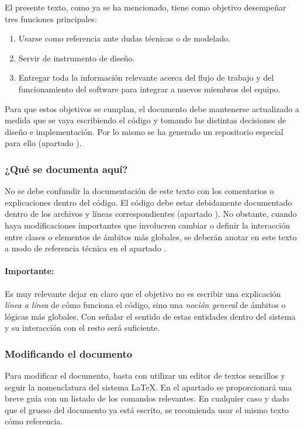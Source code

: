 El presente texto, como ya se ha mencionado, tiene como objetivo desempeñar tres funciones principales:
\begin{enumerate}[noitemsep]
	\item Usarse como referencia ante dudas técnicas o de modelado.
	
	\item Servir de instrumento de diseño.
	
	\item Entregar toda la información relevante acerca del flujo de trabajo y del funcionamiento del software para integrar a nuevos miembros del equipo.
\end{enumerate}

Para que estos objetivos se cumplan, el documento debe mantenerse actualizado a medida que se vaya escribiendo el código y tomando las distintas decisiones de diseño e implementación. Por lo mismo se ha generado un repositorio especial para ello (apartado ). 

\subsubsection*{¿Qué se documenta aquí?}
No se debe confundir la documentación de este texto con los comentarios o explicaciones dentro del código. El código debe estar debidamente documentado dentro de los archivos y líneas correspondientes (apartado ). No obstante, cuando haya modificaciones importantes que involucren cambiar o definir la interacción entre clases o elementos de ámbitos más globales, se deberán anotar en este texto a modo de referencia técnica en el apartado .

\paragraph*{Importante:}
Es muy relevante dejar en claro que el objetivo no es escribir una explicación \emph{línea a línea} de cómo funciona el código, sino una \emph{noción general} de ámbitos o lógicas más globales. Con señalar el sentido de estas entidades dentro del sistema y su interacción con el resto será suficiente.

\subsubsection{Modificando el documento}\label{flujo:modificando-el-documento}
Para modificar el documento, basta con utilizar un editor de textos sencillos y seguir la nomenclatura del sistema \LaTeX. En el apartado  se proporcionará una breve guía con un listado de los comandos relevantes. En cualquier caso y dado que el grueso del documento ya está escrito, se recomienda usar el mismo texto cómo referencia.

